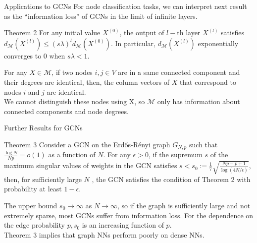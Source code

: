 \documentclass{beamer}
\theoremstyle{definition}
\begin{document}
\begin{frame}{Applications to GCNs}
    For node classification tasks, we can interpret next result as the “information loss” of GCNs in the limit of infinite layers.
    \begin{block}{Theorem 2}
        For any initial value \(X^{(0)}\), the output of \(l-\)th layer \(X^{(l)}\) satisfies \(d_{\mathcal{M}}(X^{(l)})\leq(s\lambda)^{l}d_{\mathcal{M}}(X^{(0)})\). In particular, \(d_{\mathcal{M}}(X^{(l)})\) exponentially converges to \(0\) when \(s\lambda < 1\).
    \end{block} \pause
    For any \(X \in \mathcal{M}\), if two nodes \(i,j\in V\) are in a same connected component and their degrees are identical, then, the column vectors of \(X\) that correspond to nodes \(i\) and \(j\) are identical. \\
    \bigskip
    We cannot distinguish these nodes using X, so \(\mathcal{M}\) only has information about connected components and node degrees.
\end{frame}

\begin{frame}{Further Results for GCNs}
    \begin{block}{Theorem 3}
        Consider a GCN on the Erdős-Rényi graph \(G_{N,p}\) such that \(\frac{\log{N}}{N p} = o(1)\) as a function of \(N\). For any \(\epsilon > 0\), if the supremum \(s\) of the maximum singular values of weights in the GCN satisfies \(s < s_{0} := \frac{1}{7}\sqrt{\frac{Np-p+1}{\log{(4N/\epsilon)}}}\), then, for sufficiently large \(N\) , the GCN satisfies the condition of Theorem 2 with probability at least \(1-\epsilon\).
    \end{block} \pause
    The upper bound \(s_{0}\rightarrow\infty\) as \(N \rightarrow\infty\), so if the graph is sufficiently large and not extremely sparse, most GCNs suffer from information loss. For the dependence on the edge probability \(p, s_{0}\) is an increasing function of \(p\). \\
    \bigskip
    Theorem 3 implies that graph NNs perform poorly on dense NNs.
\end{frame}


    


    
\end{document}
